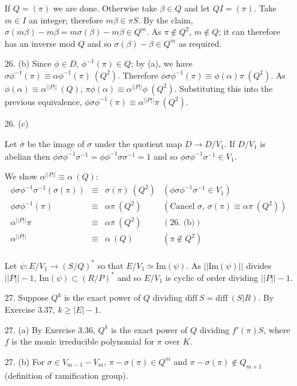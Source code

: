 \documentclass{article}
\newcommand{\image}[1]{\text{Im}(#1)}
\newcommand{\diff}[1]{\text{diff}\ #1}
\newcommand{\modequiv}[3]{#1 \equiv #2\ (#3)}
\begin{document}
\begin{enumerate}
If $Q = (\pi)$ we are done.  Otherwise take $\beta \in Q$ and let $QI = (\pi)$.  Take $m \in I$ an integer; therefore $m \beta \in \pi S$.  By the claim, $\sigma(m \beta) - m \beta = m\sigma(\beta) - m \beta \in Q^{m}$.  As $\pi \not\in Q^2$, $m \not \in Q$; it can therefore has an inverse mod $Q$ and so $\sigma(\beta) - \beta \in Q^{m}$ as required.

\item [26. (b)] Since $\phi \in D$, $\phi^{-1}(\pi) \in Q$; by (a), we have $\modequiv{\sigma\phi^{-1}(\pi)}{\alpha\phi^{-1}(\pi)}{Q^2}$.  Therefore $\modequiv{\phi \sigma \phi^{-1}(\pi)}{\phi(\alpha)\pi}{Q^2}$.  As $\modequiv{\phi(\alpha)}{\alpha^{||P||}}{Q}$, $\modequiv{\pi\phi(\alpha)}{\alpha^{||P||}\phi}{Q^2}$.  Substituting this into the previous equivalence, $\modequiv{\phi\sigma\phi^{-1}(\pi)}{\alpha^{||P||}\pi}{Q^2}$.

\item [26. (c)]

Let $\bar{\sigma}$ be the image of $\sigma$ under the quotient map $D \to D / V_1$.  If $D / V_1$ is abelian then $\overline{\phi\sigma\phi^{-1}\sigma^{-1}} = \overline{\phi\phi^{-1}}\overline{\sigma\sigma^{-1}} = 1$ and so $\phi\sigma\phi^{-1}\sigma^{-1}\in V_1$.

We show $\modequiv{\alpha^{||P||}}{\alpha}{Q}$:
\[
\begin{array}{cccc}
    \phi\sigma\phi^{-1}\sigma^{-1}(\sigma(\pi)) &\equiv& \sigma(\pi) \ (Q^2) & (\phi\sigma\phi^{-1}\sigma^{-1} \in V_1) \\
    \phi\sigma\phi^{-1}(\pi) &\equiv& \alpha\pi \ (Q^2 )& (\text{Cancel $\sigma$, $\modequiv{\sigma(\pi)}{\alpha\pi}{Q^2}$}) \\
    \alpha^{||P||}\pi &\equiv& \alpha \pi\ (Q^2) & (\text{26. (b)}) \\
    \alpha^{||P||} &\equiv& \alpha \ (Q) & (\pi \not \in Q^2) \\
\end{array}
\]

Let $\psi : E / V_{1} \to (S / Q)^{*}$ so that $E / V_1 \simeq \image{\psi}$.  As $||\image{\psi}||$ divides $||P|| - 1$, $\image{\psi} \subset (R / P)^{*}$ and so $E / V_{1}$ is cyclic of order dividing $||P|| - 1$.

\item[27.]  Suppose $Q^k$ is the exact power of $Q$ dividing $\diff{S} = \diff(S|R)$.  By Exercise 3.37, $k \ge |E| - 1$.
\item[27. (a)] By Exercise 3.36, $Q^k$ is the exact power of $Q$ dividing $f'(\pi)S$, where $f$ is the monic irreducible polynomial for $\pi$ over $K$.
\item[27. (b)] For $\sigma \in V_{m-1} - V_{m}$, $\pi - \sigma(\pi) \in Q^{m}$ and $\pi - \sigma(\pi) \not\in Q_{m + 1}$ (definition of ramification group).


\end{enumerate}
\end{document}
